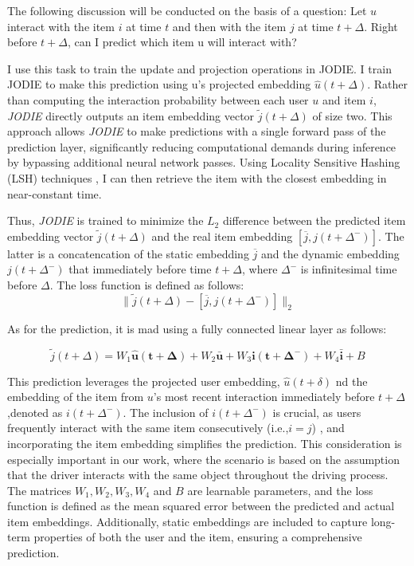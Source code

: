 The following discussion will be conducted on the basis of a question: Let $u$ interact with the item $i$ at time $t$ and then with the item $j$ at time $t + \Delta$. Right before $t + \Delta$, can I predict which item u will interact with?

I use this task to train the update and projection operations in JODIE. I train JODIE to make this prediction using u’s projected embedding $ \hat{u}(t+ \Delta)$. Rather than computing the interaction probability between each user $u$ and item $i$, \textit{JODIE} directly outputs an item embedding vector $\tilde{j}(t + \Delta)$ of size two. This approach allows \textit{JODIE} to make predictions with a single forward pass of the prediction layer, significantly reducing computational demands during inference by bypassing additional neural network passes. Using Locality Sensitive Hashing (LSH) techniques \cite{rajaraman2011mining}, I can then retrieve the item with the closest embedding in near-constant time.

Thus, \textit{JODIE} is trained to minimize the $L_2$ difference between the predicted item embedding vector $\tilde{j}(t + \Delta)$ and the real item embedding $[\overline{j}, j(t + \Delta^-)]$. The latter is a concatencation of the static embedding $\overline{j}$ and the dynamic embedding $j(t + \Delta^-)$ that immediately before time $t+\Delta$, where $\Delta^-$ is infinitesimal time before $\Delta$. The loss function is defined as follows:
\[ \| \tilde{j}(t + \Delta) - [\overline{j}, j(t + \Delta^-)] \|_2 \]

As for the prediction, it is mad using a fully connected linear layer as follows:

\[\tilde{j}(t+\Delta)=W_1\mathbf{\hat{u}(t+\Delta)}+W_2\mathbf{\bar{u}}+W_3\mathbf{i(t+\Delta ^-)}+W_4\mathbf{\bar{i}}+B\]

This prediction leverages the projected user embedding, $\hat{u}(t+\delta)$ nd the embedding of the item from $u$'s most recent interaction immediately before $t+\Delta$,denoted as $i(t+\Delta ^-)$. The inclusion of $i(t+\Delta ^-)$ is crucial, as users frequently interact with the same item consecutively (i.e.,$i=j$) , and incorporating the item embedding simplifies the prediction. This consideration is especially important in our work, where the scenario is based on the assumption that the driver interacts with the same object throughout the driving process. The matrices $W_1,W_2,W_3,W_4$ and $B$ are learnable parameters, and the loss function is defined as the mean squared error between the predicted and actual item embeddings. Additionally, static embeddings are included to capture long-term properties of both the user and the item, ensuring a comprehensive prediction.


